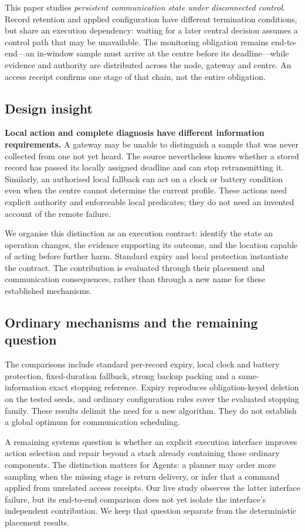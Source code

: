 \documentclass[journal,10pt]{IEEEtran}
\begin{document}
This paper studies \emph{persistent communication state under disconnected control}. Record
retention and applied configuration have different termination conditions, but share an execution
dependency: waiting for a later central decision assumes a control path that may be unavailable.
The monitoring obligation remains end-to-end---an in-window sample must arrive at the centre
before its deadline---while evidence and authority are distributed across the node, gateway and
centre. An access receipt confirms one stage of that chain, not the entire obligation.

\subsection{Design insight}
\textbf{Local action and complete diagnosis have different information requirements.} A gateway
may be unable to distinguish a sample that was never collected from one not yet heard. The
source nevertheless knows whether a stored record has passed its locally assigned deadline and
can stop retransmitting it. Similarly, an authorised local fallback can act on a clock or
battery condition even when the centre cannot determine the current profile. These actions
need explicit authority and enforceable local predicates; they do not need an invented account
of the remote failure.

We organise this distinction as an execution contract: identify the state an operation changes,
the evidence supporting its outcome, and the location capable of acting before further harm.
Standard expiry and local protection instantiate the contract. The contribution is evaluated
through their placement and communication consequences, rather than through a new name for
these established mechanisms.

\subsection{Ordinary mechanisms and the remaining question}
The comparisons include standard per-record expiry, local clock and battery protection,
fixed-duration fallback, strong backup packing and a same-information exact stopping reference.
Expiry reproduces obligation-keyed deletion on the tested seeds, and ordinary configuration
rules cover the evaluated stopping family. These results delimit the need for a new algorithm.
They do not establish a global optimum for communication scheduling.

A remaining systems question is whether an explicit execution interface improves action selection
and repair beyond a stack already containing those ordinary components. The distinction matters
for Agents: a planner may order more sampling when the missing stage is return delivery, or infer
that a command applied from unrelated access receipts. Our live study observes the latter
interface failure, but its end-to-end comparison does not yet isolate the interface's independent
contribution. We keep that question separate from the deterministic placement results.
\end{document}
